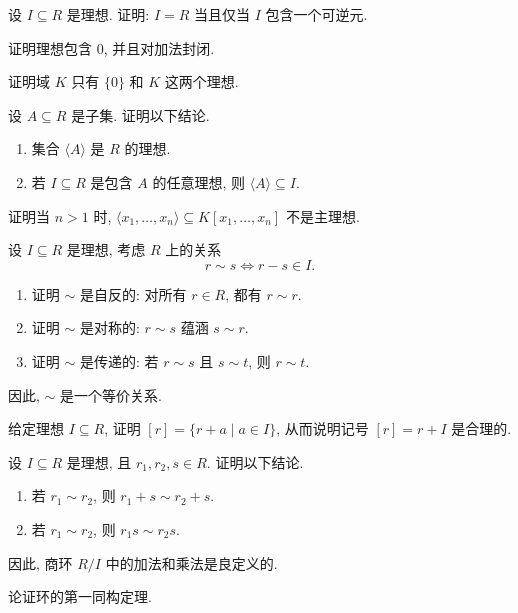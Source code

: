 \BookExerciseHeading
\begin{BookExercises}
  \item\label{ex:ideal-containing-unit} 设 $I\subseteq R$ 是理想. 证明: $I=R$ 当且仅当 $I$ 包含一个可逆元.
  \item\label{ex:ideal-zero-and-addition} 证明理想包含 $0$, 并且对加法封闭.
  \item\label{ex:ideals-of-field} 证明域 $K$ 只有 $\{0\}$ 和 $K$ 这两个理想.
  \item\label{ex:ideal-generated-by-set} 设 $A\subseteq R$ 是子集. 证明以下结论.
    \begin{enumerate}[label=(\alph*)]
      \item 集合 $\langle A\rangle$ 是 $R$ 的理想.
      \item 若 $I\subseteq R$ 是包含 $A$ 的任意理想, 则 $\langle A\rangle\subseteq I$.
    \end{enumerate}
  \item\label{ex:variables-ideal-not-principal} 证明当 $n>1$ 时, $\langle x_{1},\ldots,x_{n}\rangle\subseteq K[x_{1},\ldots,x_{n}]$ 不是主理想.
  \item\label{ex:coset-relation-equivalence} 设 $I\subseteq R$ 是理想, 考虑 $R$ 上的关系
    \[
      r\sim s\iff r-s\in I.
    \]
    \begin{enumerate}[label=(\alph*)]
      \item 证明 $\sim$ 是自反的: 对所有 $r\in R$, 都有 $r\sim r$.
      \item 证明 $\sim$ 是对称的: $r\sim s$ 蕴涵 $s\sim r$.
      \item 证明 $\sim$ 是传递的: 若 $r\sim s$ 且 $s\sim t$, 则 $r\sim t$.
    \end{enumerate}
    因此, $\sim$ 是一个等价关系.
  \item\label{ex:coset-representative-sum} 给定理想 $I\subseteq R$, 证明 $[r]=\{r+a\mid a\in I\}$, 从而说明记号 $[r]=r+I$ 是合理的.
  \item\label{ex:quotient-operations-well-defined} 设 $I\subseteq R$ 是理想, 且 $r_{1},r_{2},s\in R$. 证明以下结论.
    \begin{enumerate}[label=(\alph*)]
      \item 若 $r_{1}\sim r_{2}$, 则 $r_{1}+s\sim r_{2}+s$.
      \item 若 $r_{1}\sim r_{2}$, 则 $r_{1}s\sim r_{2}s$.
    \end{enumerate}
    因此, 商环 $R/I$ 中的加法和乘法是良定义的.
  \item\label{ex:prove-first-ring-isomorphism-theorem} 论证环的第一同构定理.

\end{BookExercises}
